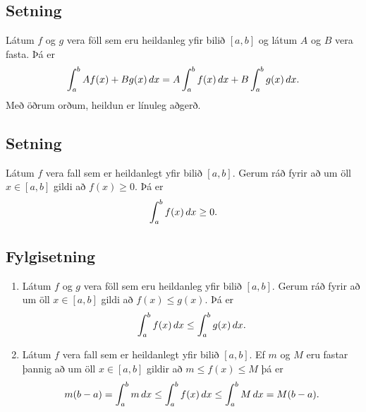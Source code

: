 \documentclass[b5paper,10pt,icelandic]{sphinxmanual}
\begin{document}
\subsection{Setning}
\label{kafli06:id4}
Látum \(f\) og \(g\) vera föll sem eru heildanleg yfir bilið
\([a,b]\) og látum \(A\) og \(B\) vera fasta. Þá er
\begin{gather}
\begin{split}\int_a^b Af(x)+Bg(x)\,dx=A\int_a^b f(x)\,dx+B\int_a^b g(x)\,dx.\end{split}\notag
\end{gather}
Með öðrum orðum, heildun er línuleg aðgerð.


\subsection{Setning}
\label{kafli06:id5}
Látum \(f\) vera fall sem er heildanlegt yfir bilið \([a, b]\).
Gerum ráð fyrir að um öll \(x\in [a, b]\) gildi að
\(f(x)\geq 0\). Þá er
\begin{gather}
\begin{split}\int_a^b f(x)\,dx\geq 0.\end{split}\notag
\end{gather}

\subsection{Fylgisetning}
\label{kafli06:fylgisetning}\begin{enumerate}
\item {} 
Látum \(f\) og \(g\) vera föll sem eru heildanleg yfir
bilið \([a, b]\). Gerum ráð fyrir að um öll \(x\in [a, b]\)
gildi að \(f(x)\leq g(x)\). Þá er
\begin{gather}
\begin{split}\int_a^b f(x)\,dx\leq \int_a^b g(x)\,dx.\end{split}\notag
\end{gather}
\item {} 
Látum \(f\) vera fall sem er heildanlegt yfir bilið
\([a, b]\). Ef \(m\) og \(M\) eru fastar þannig að um
öll \(x\in [a, b]\) gildir að \(m\leq f(x)\leq M\) þá er
\begin{gather}
\begin{split}m(b-a)= \int_a^b m\,dx \leq  \int_a^b f(x)\,dx \leq \int_a^b M\,dx =M(b-a).\end{split}\notag
\end{gather}
\end{enumerate}
\end{document}
